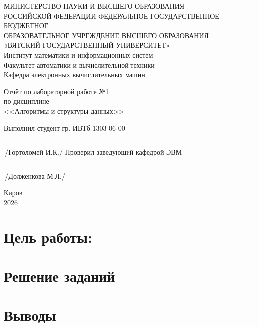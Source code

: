 \documentclass[oneside,a4paper,14pt]{extarticle} %
\begin{document}
	\newpage\thispagestyle{empty}
	\begin{center}
		МИНИСТЕРСТВО НАУКИ И ВЫСШЕГО ОБРАЗОВАНИЯ\\
			РОССИЙСКОЙ ФЕДЕРАЦИИ
			ФЕДЕРАЛЬНОЕ ГОСУДАРСТВЕННОЕ БЮДЖЕТНОЕ\\
			ОБРАЗОВАТЕЛЬНОЕ
			УЧРЕЖДЕНИЕ ВЫСШЕГО ОБРАЗОВАНИЯ\\
			«ВЯТСКИЙ ГОСУДАРСТВЕННЫЙ УНИВЕРСИТЕТ»\\
			Институт математики и информационных систем\\
			Факультет автоматики и вычислительной техники\\
			Кафедра электронных вычислительных машин
	\end{center}
	\vspace{20mm}

	\begin{center}
		Отчёт по лабораторной работе №1\\
		по дисциплине\\
		<<Алгоритмы и структуры данных>>\\
	\end{center}
	\vspace{48mm}

	\noindent
	Выполнил студент гр. ИВТб-1303-06-00 \hfill \rule[-0,5mm]{30mm}{0.15mm}\,/Гортоломей И.К./
	\newline
	Проверил заведующий кафедрой ЭВМ \hfill \rule[-0,5mm]{30mm}{0.15mm}\,/Долженкова М.Л./

	\vfill
	\begin{center}
		Киров\\
		2026
	\end{center}

	\newpage
	\thispagestyle{empty}

	\section*{Цель работы:} 
	\newpage
	\section*{Решение заданий}
	
	\section*{Выводы} 
\end{document}
